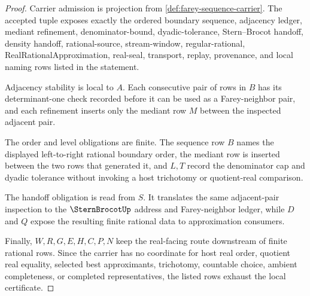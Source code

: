 \begin{proof}
Carrier admission is projection from \autoref{def:farey-sequence-carrier}. The accepted tuple exposes exactly the ordered boundary sequence, adjacency ledger, mediant refinement, denominator-bound, dyadic-tolerance, Stern--Brocot handoff, density handoff, rational-source, stream-window, regular-rational, RealRationalApproximation, real-seal, transport, replay, provenance, and local naming rows listed in the statement.

Adjacency stability is local to $A$. Each consecutive pair of rows in $B$ has its determinant-one check recorded before it can be used as a Farey-neighbor pair, and each refinement inserts only the mediant row $M$ between the inspected adjacent pair.

The order and level obligations are finite. The sequence row $B$ names the displayed left-to-right rational boundary order, the mediant row is inserted between the two rows that generated it, and $L,T$ record the denominator cap and dyadic tolerance without invoking a host trichotomy or quotient-real comparison.

The handoff obligation is read from $S$. It translates the same adjacent-pair inspection to the $\SternBrocotUp$ address and Farey-neighbor ledger, while $D$ and $Q$ expose the resulting finite rational data to approximation consumers.

Finally, $W,R,G,E,H,C,P,N$ keep the real-facing route downstream of finite rational rows. Since the carrier has no coordinate for host real order, quotient real equality, selected best approximants, trichotomy, countable choice, ambient completeness, or completed representatives, the listed rows exhaust the local certificate.
\end{proof}

